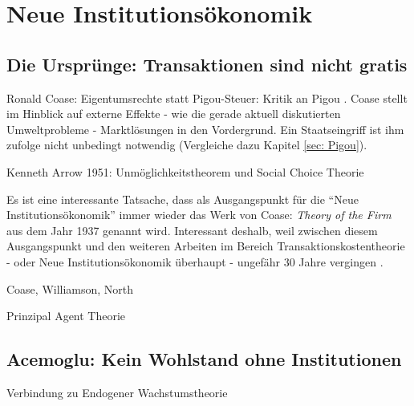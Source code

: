 %
%
%

\chapter{Neue Institutionsökonomik}
\label{Neue Institut}

\section{Die Ursprünge: Transaktionen sind nicht gratis} \label{sec: Neue Inst}

Ronald Coase: Eigentumsrechte statt Pigou-Steuer: Kritik an Pigou \textcite[S. 243]{Cansier1989}. Coase stellt im Hinblick auf externe Effekte - wie die gerade aktuell diskutierten Umweltprobleme - Marktlösungen in den Vordergrund. Ein Staatseingriff ist ihm zufolge nicht unbedingt notwendig (Vergleiche dazu Kapitel \ref{sec: Pigou}).

Kenneth Arrow 1951: Unmöglichkeitstheorem und Social Choice Theorie



Es ist eine interessante Tatsache, dass als Ausgangspunkt für die "`Neue Institutionsökonomik"' immer wieder das Werk von Coase: \textit{Theory of the Firm} aus dem Jahr 1937 genannt wird. Interessant deshalb, weil zwischen diesem Ausgangspunkt und den weiteren Arbeiten im Bereich Transaktionskostentheorie -  oder Neue Institutionsökonomik überhaupt - ungefähr 30 Jahre vergingen \parencite[S. 148]{Blaug2001}.

Coase, Williamson, North

Prinzipal Agent Theorie


\section{Acemoglu: Kein Wohlstand ohne Institutionen}
Verbindung zu Endogener Wachstumstheorie \textcite[S. 633ff]{Snowdon2005}


